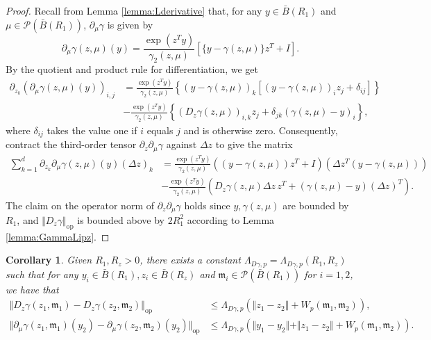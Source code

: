\documentclass{article}
\newtheorem{corollary}[theorem]{Corollary}
\begin{document}
\begin{appendices}
\begin{proof}
 Recall from Lemma \ref{lemma:Lderivative} that, for any  $y \in \bar B(R_1)$ and $\mu\in \mathcal P(\bar B(R_1))$,  $\partial_\mu\gamma$ is given by
 \begin{equation}\label{eqn:Dmugamma}
               \partial_\mu \gamma(z,\mu)(y) = \frac{\exp(z^Ty)}{\gamma_2(z,\mu)}\left[  \{y-\gamma(z,\mu)\} z^T+I\right]. 
 \end{equation}
By the quotient and product rule for differentiation,  we get
\begin{align*}
    \partial_{z_k}(\partial_{\mu}\gamma(z,\mu)(y))_{i,j}& = \frac{\exp(z^Ty)}{\gamma_2(z,\mu)}\left\{(y-\gamma(z,\mu))_k\left[(y-\gamma(z,\mu))_iz_j+\delta_{ij}\right] \right\}\\&-\frac{\exp(z^Ty)}{\gamma_2(z,\mu)}\left\{(D_z\gamma(z,\mu))_{i,k}z_j+\delta_{jk}(\gamma(z,\mu)-y)_i\right\},
\end{align*}
where $\delta_{ij}$ takes the value one if $i$ equals $j$ and is otherwise zero. Consequently, contract the third-order tensor $\partial_z\partial_\mu\gamma$ against $\Delta z$ to give the matrix
\begin{align*}
    \sum_{k=1}^d\partial_{z_k}\partial_{\mu}\gamma(z,\mu)(y)(\Delta z)_k&= \frac{\exp(z^Ty)}{\gamma_2(z,\mu)}\left( (y-\gamma(z,\mu))z^T+I\right)(\Delta z^T(y-\gamma(z,\mu)))\\&-\frac{\exp(z^Ty)}{\gamma_2(z,\mu)}\left( D_z\gamma(z,\mu)\Delta z\, z^T +(\gamma(z,\mu)-y)(\Delta z)^T\right).
\end{align*}
The claim on the operator norm of $\partial_z\partial_\mu\gamma$ holds since $y,\gamma(z,\mu)$ are bounded by $R_1$, and $\Vert D_z\gamma\Vert_\mathrm{op}$ is bounded above by $2R_1^2$ according to Lemma \ref{lemma:GammaLipz}.
\end{proof}
\begin{corollary}\label{cor:LipGammaDerivs}
Given $R_1,R_z>0$, there exists a constant $\Lambda_{D\gamma,p}=\Lambda_{D\gamma,p}(R_1,R_z)$ such that for any $y_i\in \bar B(R_1), z_i\in \bar B(R_z)$ and $\mathfrak{m}_i\in \mathcal P(\bar B(R_1))$ for $i=1,2$, we have that
\begin{align*}
    \Vert D_z\gamma(z_1,\mathfrak{m}_1)-D_z\gamma(z_2,\mathfrak{m}_2)\Vert_\mathrm{op}&\le \Lambda_{D\gamma,p} \left(\Vert z_1-z_2\Vert +W_p(\mathfrak{m}_1,\mathfrak{m}_2) \right),\\
    \Vert \partial_\mu\gamma(z_1,\mathfrak{m}_1)(y_2)-\partial_\mu\gamma(z_2,\mathfrak{m}_2)(y_2)\Vert_\mathrm{op}&\le\Lambda_{D\gamma,p} \left(\Vert y_1-y_2\Vert+\Vert z_1-z_2\Vert +W_p(\mathfrak{m}_1,\mathfrak{m}_2) \right).

\end{align*}
\end{corollary}
\end{appendices}
\end{document}
